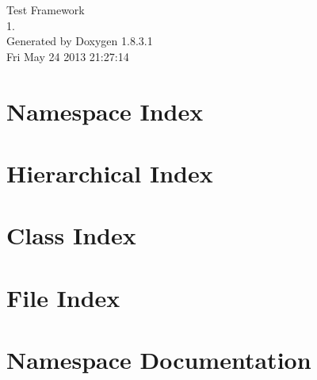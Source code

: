 \documentclass{book}
\begin{document}
\hypersetup{pageanchor=false,citecolor=blue}
\begin{titlepage}
\vspace*{7cm}
\begin{center}
{\Large Test Framework \\[1ex]\large 1. }\\
\vspace*{1cm}
{\large Generated by Doxygen 1.8.3.1}\\
\vspace*{0.5cm}
{\small Fri May 24 2013 21:27:14}\\
\end{center}
\end{titlepage}
\clearemptydoublepage
{}
\tableofcontents
\clearemptydoublepage
{}
\hypersetup{pageanchor=true,citecolor=blue}
\chapter{Namespace Index}

\chapter{Hierarchical Index}

\chapter{Class Index}

\chapter{File Index}

\chapter{Namespace Documentation}









\end{document}
